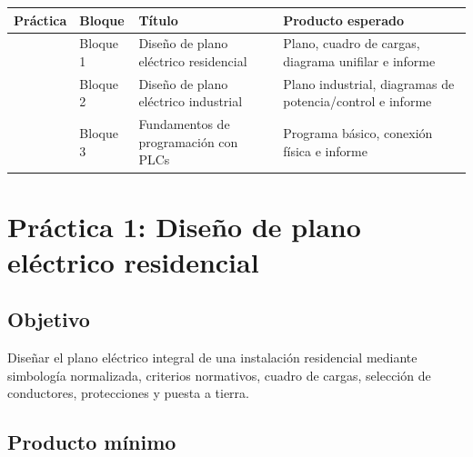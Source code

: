 \documentclass[
  spanish,
  letterpaper,
  DIV=11,
  numbers=noendperiod]{scrreprt}
\newcounter{none} %
\begin{document}
{\def\LTcaptype{none} %
\begin{longtable}[]{@{}
  >{\raggedright\arraybackslash}p{}
  >{\raggedright\arraybackslash}p{}
  >{\raggedright\arraybackslash}p{}
  >{\raggedright\arraybackslash}p{}@{}}
\toprule\noalign{}
\begin{minipage}[b]{\linewidth}\raggedright
Práctica
\end{minipage} & \begin{minipage}[b]{\linewidth}\raggedright
Bloque
\end{minipage} & \begin{minipage}[b]{\linewidth}\raggedright
Título
\end{minipage} & \begin{minipage}[b]{\linewidth}\raggedright
Producto esperado
\end{minipage} \\
\midrule\noalign{}
\endhead
\bottomrule\noalign{}
\endlastfoot
1 & Bloque 1 & Diseño de plano eléctrico residencial & Plano, cuadro de
cargas, diagrama unifilar e informe \\
2 & Bloque 2 & Diseño de plano eléctrico industrial & Plano industrial,
diagramas de potencia/control e informe \\
3 & Bloque 3 & Fundamentos de programación con PLCs & Programa básico,
conexión física e informe \\
\end{longtable}
}

\section{Práctica 1: Diseño de plano eléctrico
residencial}\label{pruxe1ctica-1-diseuxf1o-de-plano-eluxe9ctrico-residencial}

\subsection{Objetivo}\label{objetivo}

Diseñar el plano eléctrico integral de una instalación residencial
mediante simbología normalizada, criterios normativos, cuadro de cargas,
selección de conductores, protecciones y puesta a tierra.

\subsection{Producto mínimo}\label{producto-muxednimo}
\end{document}
